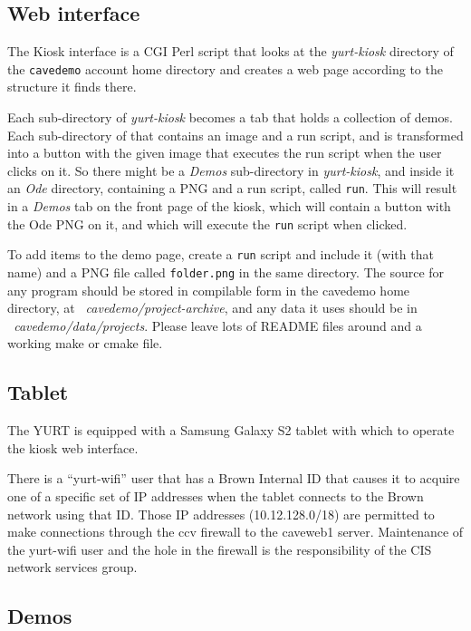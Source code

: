 \documentclass[11pt]{article}
\newcommand{\cmd}[1]{\texttt{#1}\xspace}
\newcommand{\dir}[1]{\textit{#1}\xspace}
\begin{document}
\subsection{Web interface}

The Kiosk interface is a CGI Perl script that looks at the
\dir{yurt-kiosk} directory of the \cmd{cavedemo} account home
directory and creates a web page according to the structure it finds
there.

Each sub-directory of \dir{yurt-kiosk} becomes a tab that holds a
collection of demos.  Each sub-directory of that contains an image and
a run script, and is transformed into a button with the given image
that executes the run script when the user clicks on it.  So there
might be a \dir{Demos} sub-directory in \dir{yurt-kiosk}, and inside
it an \dir{Ode} directory, containing a PNG and a run script, called
\cmd{run}.  This will result in a \dir{Demos} tab on the front page of
the kiosk, which will contain a button with the Ode PNG on it, and
which will execute the \cmd{run} script when clicked.


To add items to the demo page, create a \cmd{run} script and include
it (with that name) and a PNG file called \cmd{folder.png} in the same
directory.  The source for any program should be stored in compilable
form in the cavedemo home directory, at
\dir{~cavedemo/project-archive}, and any data it uses should be in
\dir{~cavedemo/data/projects}.  Please leave lots of README files
around and a working make or cmake file.

\subsection{Tablet}

The YURT is equipped with a Samsung Galaxy S2 tablet with which to
operate the kiosk web interface.

There is a ``yurt-wifi'' user that has a Brown Internal ID that causes
it to acquire one of a specific set of IP addresses when the tablet
connects to the Brown network using that ID. Those IP addresses
(10.12.128.0/18) are permitted to make connections through the ccv
firewall to the caveweb1 server.  Maintenance of the yurt-wifi user
and the hole in the firewall is the responsibility of the CIS network
services group.


\subsection{Demos}
\label{Demos}
\end{document}
